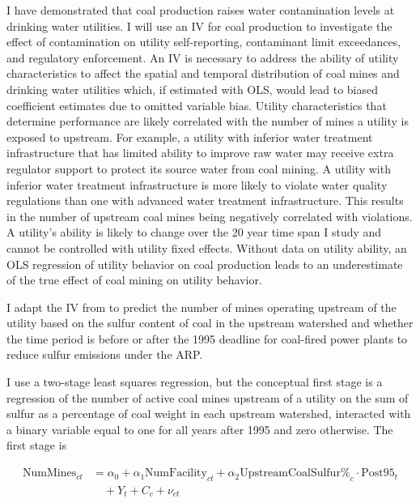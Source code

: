 \documentclass[12pt]{article}
\begin{document}
I have demonstrated that coal production raises water contamination levels at drinking water utilities. I will use an IV for coal production to investigate the effect of contamination on utility self-reporting, contaminant limit exceedances, and regulatory enforcement. An IV is necessary to address the ability of utility characteristics to affect the spatial and temporal distribution of coal mines and drinking water utilities which, if estimated with OLS, would lead to biased coefficient estimates due to omitted variable bias. Utility characteristics that determine performance are likely correlated with the number of mines a utility is exposed to upstream. For example, a utility with inferior water treatment infrastructure that has limited ability to improve raw water may receive extra regulator support to protect its source water from coal mining. A utility with inferior water treatment infrastructure is more likely to violate water quality regulations than one with advanced water treatment infrastructure. This results in the number of upstream coal mines being negatively correlated with violations. A utility's ability is likely to change over the 20 year time span I study and cannot be controlled with utility fixed effects. Without data on utility ability, an OLS regression of utility behavior on coal production leads to an underestimate of the true effect of coal mining on utility behavior. 

I adapt the IV from \textcite{stratford2015coalprod} to predict the number of mines operating upstream of the utility based on the sulfur content of coal in the upstream watershed and whether the time period is before or after the 1995 deadline for coal-fired power plants to reduce sulfur emissions under the ARP. 

I use a two-stage least squares regression, but the conceptual first stage is a regression of the number of active coal mines upstream of a utility on the sum of sulfur as a percentage of coal weight in each upstream watershed, interacted with a binary variable equal to one for all years after 1995 and zero otherwise. The first stage is

\begin{equation}\label{1ststage2sls}
\begin{split}
\text{NumMines}_{ct} &= \alpha_0 + \alpha_1\text{NumFacility}_{ct} + \alpha_2\text{UpstreamCoalSulfur\%}_c \cdot \text{Post95}_t \\
&\quad + Y_t + C_c + \nu_{ct}
\end{split}
\end{equation}
\end{document}
